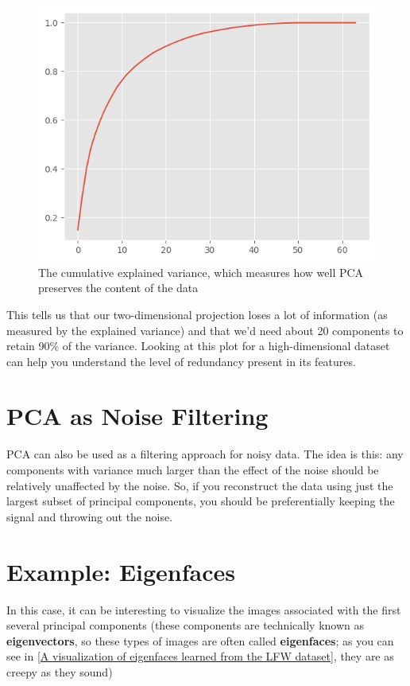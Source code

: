 \begin{figure}
    \centering
    \includegraphics{../img/fig45-8.png}
    \caption{The cumulative explained variance, which measures how well PCA preserves the content of the data}
\end{figure}

This tells us that our two-dimensional projection loses a lot of information (as measured by the explained variance) and that we'd need about 20 components to retain
90\% of the variance. Looking at this plot for a high-dimensional dataset can help you
understand the level of redundancy present in its features.

\section{PCA as Noise Filtering}
PCA can also be used as a filtering approach for noisy data. The idea is this: any components with variance much larger than the effect of the noise should be relatively unaffected by the noise. So, if you reconstruct the data using just the largest subset of principal components, you should be preferentially keeping the signal and throwing out the noise.

\section{Example: Eigenfaces}
In this case, it can be interesting to visualize the images associated with the first several principal components (these components are technically known as \textbf{eigenvectors}, so these types of images are often called \textbf{eigenfaces}; as you can see in \autoref{A visualization of eigenfaces learned from the LFW dataset}, they are as creepy as they sound)

